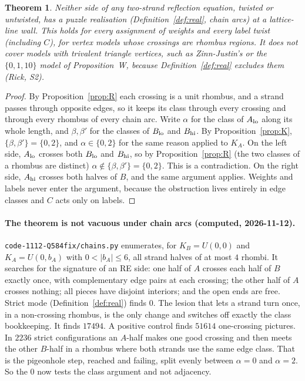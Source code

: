 \documentclass[11pt]{article}
\newtheorem{theorem}{Theorem}
\theoremstyle{definition}
\begin{document}
\begin{theorem}\label{thm:main}
Neither side of any two-strand reflection equation, twisted or untwisted, has a puzzle realisation
(Definition~\ref{def:real}, chain arcs) at a lattice-line wall. This holds for every assignment of
weights and every label twist (including $C$), for vertex models whose crossings are rhombus
regions. It does \emph{not} cover models with trivalent triangle vertices, such as Zinn-Justin's
\cite{KZJ} or the $\{0,1,10\}$ model of Proposition~W, because Definition~\ref{def:real} excludes them
(Rick, S2).
\end{theorem}
\begin{proof}
By Proposition~\ref{prop:R} each crossing is a unit rhombus, and a strand passes through opposite
edges, so it keeps its class through every crossing and through every rhombus of every chain arc. Write $\alpha$ for the class of $A_{\rm lo}$
along its whole length, and $\beta,\beta'$ for the classes of $B_{\rm lo}$ and $B_{\rm hi}$. By
Proposition~\ref{prop:K}, $\{\beta,\beta'\}=\{0,2\}$, and $\alpha\in\{0,2\}$ for the same reason
applied to $K_A$. On the left side, $A_{\rm lo}$ crosses both $B_{\rm lo}$ and $B_{\rm hi}$, so by
Proposition~\ref{prop:R} (the two classes of a rhombus are distinct) $\alpha\notin\{\beta,\beta'\}=\{0,2\}$.
This is a contradiction. On the right side, $A_{\rm hi}$ crosses both halves of $B$, and the same
argument applies. Weights and labels never enter the argument, because the obstruction lives
entirely in edge classes and $C$ acts only on labels.
\end{proof}

\paragraph{The theorem is not vacuous under chain arcs (computed, 2026-11-12).}
\texttt{code-1112-Q584fix/chains.py} enumerates, for $K_B=U(0,0)$ and $K_A=U(0,b_A)$ with $0<|b_A|\le6$,
all strand halves of at most $4$ rhombi. It searches for the signature of an RE side: one half of $A$
crosses each half of $B$ exactly once, with complementary edge pairs at each crossing; the other half of
$A$ crosses nothing; all pieces have disjoint interiors; and the open ends are free. Strict mode
(Definition~\ref{def:real}) finds $0$. The lesion that lets a strand turn once, in a non-crossing rhombus,
is the only change and switches off exactly the class bookkeeping. It finds $17494$. A positive control
finds $51614$ one-crossing pictures. In $2236$ strict configurations an $A$-half makes one good crossing
and then meets the other $B$-half in a rhombus where both strands use the same edge class. That is the
pigeonhole step, reached and failing, split evenly between $\alpha=0$ and $\alpha=2$. So the $0$ now
tests the class argument and not adjacency.
\end{document}
